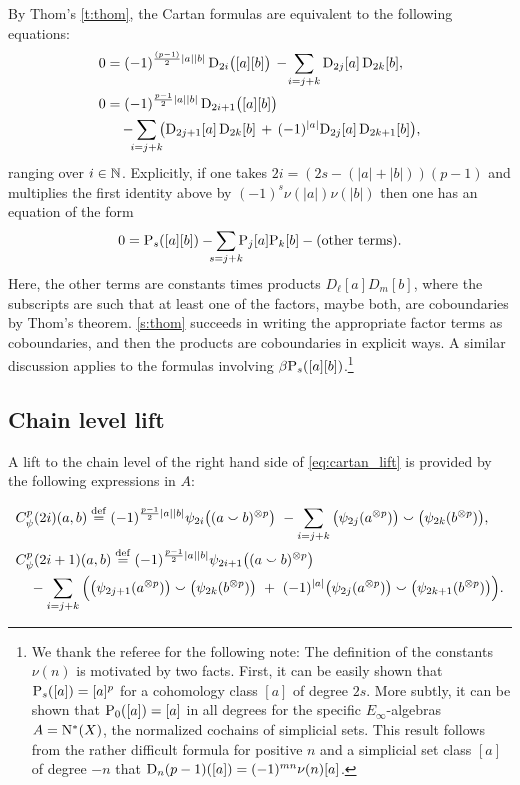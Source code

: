 By Thom's \cref{t:thom}, the Cartan formulas are equivalent to the following equations:
\begin{equation}\label{eq:cartan_lift}
	\begin{split}
		0 &= (-1)^{\frac{(p-1)}{2}\bars{a}\bars{b}} \, \rD_{2i}\big([a][b]\big) \,-\!
		\sum_{i=j+k} \rD_{2j}[a] \, \rD_{2k}[b], \\
		0 &= (-1)^{\frac{p-1}{2}\bars{a}\bars{b}} \, \rD_{2i+1}\big([a][b]\big) \\ & \quad
		-\sum_{\mathclap{i=j+k}} \big(\rD_{2j+1}[a] \, \rD_{2k}[b] \, +\, (-1)^{\bars{a}}\rD_{2j}[a] \, \rD_{2k+1}[b]\big),
	\end{split}
\end{equation}
ranging over $i \in \mathbb{N}$.
Explicitly, if one takes $2i = (2s-(|a|+|b|))(p-1)$ and multiplies the first identity above by $(-1)^s \nu(|a|)\nu(|b|)$ then one has an equation of the form
\[
0 = \rP_s([a][b]) - \sum_{\mathclap{s=j+k}} \rP_j[a] \rP_k[b] - \text{(other terms)}.
\]
Here, the other terms are constants times products $D_\ell[a] D_m[b]$, where the subscripts are such that at least one of the factors, maybe both, are coboundaries by Thom’s theorem.
\cref{s:thom} succeeds in writing the appropriate factor terms as coboundaries, and then the products are coboundaries in explicit ways.
A similar discussion applies to the formulas involving $\beta \mathrm{P}_s([a][b])$.\footnote{\label{fn:mu}
We thank the referee for the following note: The definition of the constants $\nu(n)$ is motivated by two facts.
First, it can be easily shown that $\mathrm{P}_s([a]) = [a]^p$ for a cohomology class $[a]$ of degree $2s$.
More subtly, it can be shown that $\mathrm{P}_0([a]) = [a]$ in all degrees for the specific $E_\infty$-algebras $A = \operatorname{N^{\ast}}(X)$, the normalized cochains of simplicial sets.
This result follows from the rather difficult formula for positive $n$ and a simplicial set class $[a]$ of degree $-n$ that $\mathrm{D}_n(p-1)([a]) = (-1)^{mn} \nu(n)[a]$.
}

\subsection{Chain level lift}

A lift to the chain level of the right hand side of \cref{eq:cartan_lift} is provided by the following expressions in $A$:

\begin{align*}
	&C_\psi^p(2i)(a,b) \defeq (-1)^{\frac{p-1}{2}\bars{a}\bars{b}} \psi_{2i}\big((a \cp b)^{\ot p}\big) \ -
	\sum_{i=j+k}\big(\psi_{2j}(a^{\ot p})\big) \cp \big(\psi_{2k}(b^{\ot p})\big), \\
	&C_\psi^p(2i+1)(a,b) \defeq (-1)^{\frac{p-1}{2}\bars{a}\bars{b}} \psi_{2i+1}\big((a \cp b)^{\ot p}\big) \\
	&\quad -\sum_{i=j+k} \Big(
	\big(\psi_{2j+1}(a^{\ot p})\big) \cp \big(\psi_{2k}(b^{\ot p})\big)\ +\
	(-1)^{\bars{a}}\big(\psi_{2j}(a^{\ot p})\big) \cp \big(\psi_{2k+1}(b^{\ot p})\big)
	\Big).
\end{align*}

